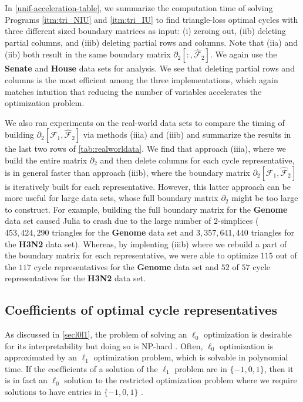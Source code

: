 In \tab \ref{unif-acceleration-table}, we summarize the computation time of solving Programs 
\ref{itm:tri_NIU} and
\ref{itm:tri_IU}
 to find triangle-loss optimal cycles with three different sized boundary matrices as input: (i) zeroing out, (iib) deleting partial columns, and (iiib) deleting partial rows and columns. Note that (iia) and (iib) both result in the same boundary matrix $\partial_2[:, \hat{\mathcal{F}}_2]$. We again use the \textbf{Senate} and \textbf{House} data sets for analysis. We see that deleting partial rows and columns is the most efficient among the three implementations, which again matches intuition that reducing the number of variables accelerates the optimization problem. 

We also ran experiments on the real-world data sets to compare the timing of building $\partial_{2}[ \mathcal{F}_1 , \hat {\mathcal{F}}_{2}]$ via methods (iiia) and (iiib) and summarize the results in the last two rows of \tab \ref{tab:realworldata}. We find that approach (iiia), where we build the entire matrix $\partial_2$ and then delete columns for each cycle representative, is in general faster than approach (iiib), where the boundary matrix $\partial_2[\mathcal{F}_1, \hat{\mathcal{F}}_2]$ is iteratively built for each representative. However, this latter approach can be more useful for large data sets, whose full boundary matrix $\partial_2$ might be too large to construct. For example, building the full boundary matrix for the \textbf{Genome} data set caused Julia to crash due to the large number  of $2$-simplices ($453,424,290$ triangles for the \textbf{Genome} data set and $3,357,641,440$ triangles for the \textbf{H3N2} data set). Whereas, by implenting (iiib) where we rebuild a part of the boundary matrix for each representative, we were able to optimize $115$ out of the $117$ cycle representatives for the \textbf{Genome} data set and $52$ of $57$ cycle representatives for the \textbf{H3N2} data set.

\subsection{Coefficients of optimal cycle representatives}
\label{coefficient}
As discussed in \se \ref{secl0l1}, the problem of solving an $\ell_0$ optimization is desirable for its interpretability but doing so is NP-hard \cite{NPhardL0}. Often, $\ell_0$ optimization is approximated by an $\ell_1$ optimization problem, which is solvable in polynomial time. If the coefficients of a solution of the $\ell_1$ problem are in $\{-1,0,1\}$, then it is in fact an $\ell_0$ solution to the restricted optimization problem where we require solutions to have entries in $\{-1, 0, 1\}$ \cite{Escolar2016, Obayashi2018}. 

